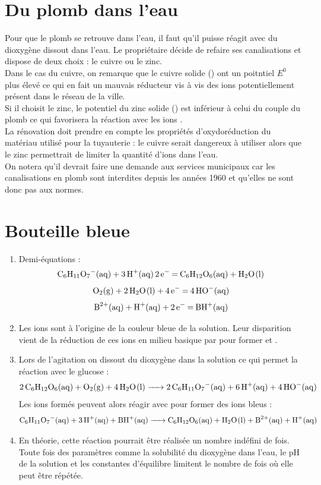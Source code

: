 \documentclass[a4paper,12pt,fleqn]{article}%
\begin{document}
\section{Du plomb dans l'eau}
Pour que le plomb se retrouve dans l'eau, il faut qu'il puisse réagit avec du dioxygène dissout dans l'eau. Le propriétaire décide de refaire ses canalisations et dispose de deux choix : le cuivre ou le zinc.\\
Dans le cas du cuivre, on remarque que le cuivre solide () ont un poitntiel $E^0$ plus élevé ce qui en fait un mauvais réducteur vis à vis des ions  potentiellement présent dans le réseau de la ville.\\
Si il choisit le zinc, le potentiel du zinc solide () est inférieur à celui du couple du plomb ce qui favorisera la réaction avec les ions .\\
La rénovation doit prendre en compte les propriétés d'oxydoréduction du matériau utilisé pour la tuyauterie : le cuivre serait dangereux à utiliser alors que le zinc permettrait de limiter la quantité d'ions  dans l'eau.\\
On notera qu'il devrait faire une demande aux services municipaux car les canalisations en plomb sont interdites depuis les années 1960 et qu'elles ne sont donc pas aux normes.

\section{Bouteille bleue}
\begin{enumerate}
    \item Demi-équations : $$\ce{C6H11O7-(aq) + 3H+(aq)  2e- = C6H12O6(aq) + H2O(l)}$$
    $$ \ce{O2(g) + 2H2O(l) + 4e- = 4HO-(aq) }$$
    $$ \ce{B^2+(aq) + H+(aq) + 2e- = BH+(aq)}$$
    \item Les ions  sont à l'origine de la couleur bleue de la solution. Leur disparition vient de la réduction de ces ions en milieu basique par  pour former  et .
    \item Lors de l'agitation on dissout du dioxygène dans la solution ce qui permet la réaction avec le glucose : $$ \ce{2C6H12O6(aq) + O2(g) + 4H2O(l) -> 2C6H11O7-(aq) + 6H+(aq) + 4HO-(aq)}$$
    Les ions  formés peuvent alors réagir avec  pour former des ions  bleus : $$ \ce{C6H11O7-(aq) + 3H+(aq) + BH+(aq) -> C6H12O6(aq) + H2O(l) +B^2+(aq) + H+(aq)}$$
    \item En théorie, cette réaction pourrait être réalisée un nombre indéfini de fois. Toute fois des paramètres comme la solubilité du dioxygène dans l'eau, le pH de la solution et les constantes d'équilibre limitent le nombre de fois où elle peut être répétée.
\end{enumerate}
\end{document}
